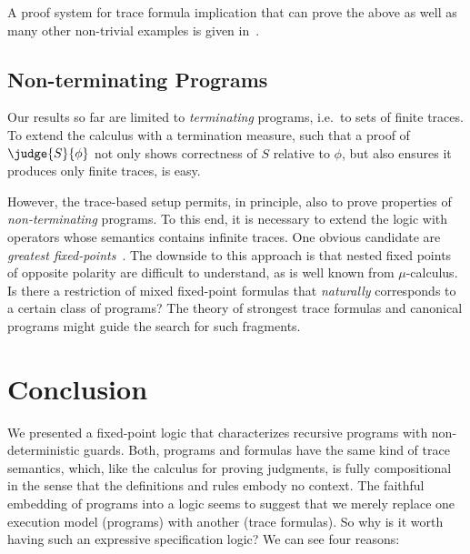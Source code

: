 \documentclass[a4paper,numberwithinsect]{lipics-v2021}
\begin{document}
A proof system for trace formula implication that can prove the above
as well as many other non-trivial examples is given
in~\cite{Heidler24}.

\subsection{Non-terminating Programs}
\label{sec:non-term-progr}

Our results so far are limited to \emph{terminating} programs, i.e.~to
sets of finite traces. To extend the calculus with a termination
measure, such that a proof of $\judge{S}{\phi}$ not only shows
correctness of $S$ relative to $\phi$, but also ensures it produces
only finite traces, is easy.

However, the trace-based setup permits, in principle, also to prove
properties of \emph{non-terminating} programs. To this end, it is
necessary to extend the logic with operators whose semantics contains
infinite traces. One obvious candidate are \emph{greatest
  fixed-points}~\cite{sti-93-handbook-chapter}. The downside to this
approach is that nested fixed points of opposite polarity are
difficult to understand, as is well known from $\mu$-calculus. Is
there a restriction of mixed fixed-point formulas that
\emph{naturally} corresponds to a certain class of programs? The
theory of strongest trace formulas and canonical programs might guide
the search for such fragments.


\section{Conclusion}
\label{sec:extro}

We presented a fixed-point logic that characterizes recursive programs
with non-deterministic guards. Both, programs and formulas have the
same kind of trace semantics, which, like the calculus for proving
judgments, is fully compositional in the sense that the definitions
and rules embody no context.
%
The faithful embedding of programs into a logic seems to suggest that
we merely replace one execution model (programs) with another (trace
formulas). So why is it worth having such an expressive specification
logic? We can see four reasons:

\end{document}
